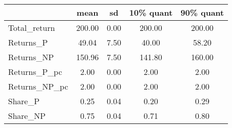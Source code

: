 \begin{tabular}{lcccc}
\toprule
{} &    mean &    sd &  10\% quant &  90\% quant \\
\midrule
Total\_return  &  200.00 &  0.00 &     200.00 &     200.00 \\
Returns\_P     &   49.04 &  7.50 &      40.00 &      58.20 \\
Returns\_NP    &  150.96 &  7.50 &     141.80 &     160.00 \\
Returns\_P\_pc  &    2.00 &  0.00 &       2.00 &       2.00 \\
Returns\_NP\_pc &    2.00 &  0.00 &       2.00 &       2.00 \\
Share\_P       &    0.25 &  0.04 &       0.20 &       0.29 \\
Share\_NP      &    0.75 &  0.04 &       0.71 &       0.80 \\
\bottomrule
\end{tabular}
